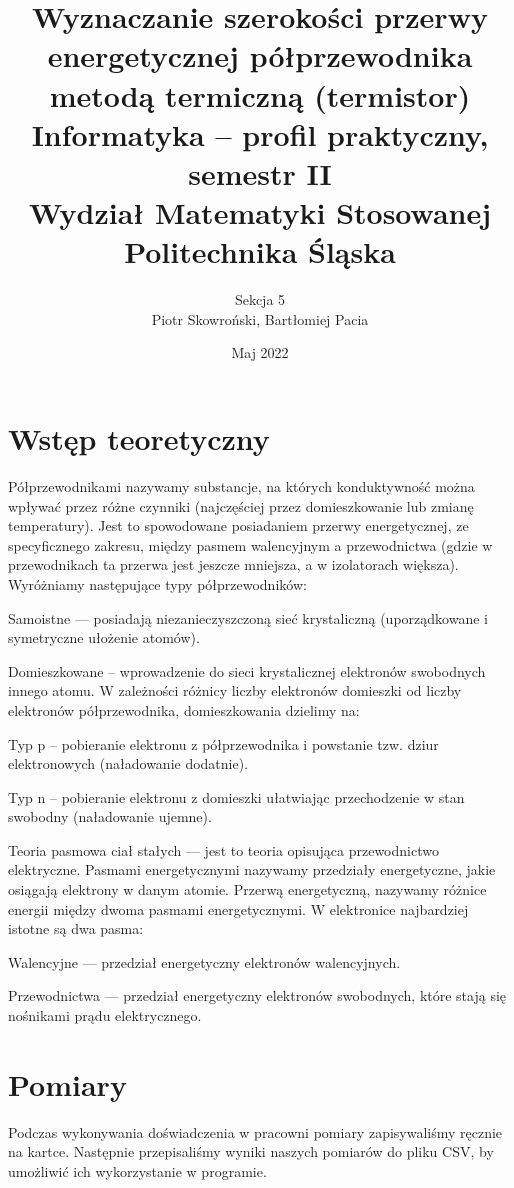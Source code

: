 \documentclass[12pt]{article}
\title{ Wyznaczanie szerokości przerwy energetycznej
    półprzewodnika metodą termiczną (termistor) \\
    \large Informatyka – profil praktyczny, semestr II \\
    Wydział Matematyki Stosowanej \\
    Politechnika Śląska \\}
\author{ Sekcja 5 \\
    Piotr Skowroński, Bartłomiej Pacia}
\date{Maj 2022}
\begin{document}
\maketitle

\section{Wstęp teoretyczny}
Półprzewodnikami nazywamy substancje, na których konduktywność
można wpływać przez różne czynniki (najczęściej przez domieszkowanie
lub zmianę temperatury). Jest to spowodowane posiadaniem przerwy
energetycznej, ze specyficznego zakresu, między pasmem walencyjnym
a przewodnictwa (gdzie w przewodnikach ta przerwa jest jeszcze
mniejsza, a w izolatorach większa). Wyróżniamy następujące typy
półprzewodników:

Samoistne — posiadają niezanieczyszczoną sieć krystaliczną
(uporządkowane i symetryczne ułożenie atomów).

Domieszkowane – wprowadzenie do sieci krystalicznej elektronów
swobodnych innego atomu. W zależności różnicy liczby elektronów
domieszki od liczby elektronów półprzewodnika, domieszkowania
dzielimy na:

\indent \indent Typ p – pobieranie elektronu z półprzewodnika i
powstanie tzw. dziur elektronowych (naładowanie dodatnie).

\indent \indent Typ n – pobieranie elektronu z domieszki ułatwiając
przechodzenie w stan swobodny (naładowanie ujemne).

Teoria pasmowa ciał stałych — jest to teoria opisująca przewodnictwo
elektryczne. Pasmami energetycznymi nazywamy przedziały energetyczne,
jakie osiągają elektrony w danym atomie. Przerwą energetyczną,
nazywamy różnice energii między dwoma pasmami energetycznymi.
W elektronice najbardziej istotne są dwa pasma:

\indent \indent Walencyjne — przedział energetyczny elektronów
walencyjnych.

\indent \indent Przewodnictwa — przedział energetyczny elektronów
swobodnych, które stają się nośnikami prądu elektrycznego.

\section{Pomiary}

Podczas wykonywania doświadczenia w pracowni pomiary zapisywaliśmy ręcznie na
kartce. Następnie przepisaliśmy wyniki naszych pomiarów do pliku CSV, by
umożliwić ich wykorzystanie w programie.
\end{document}
